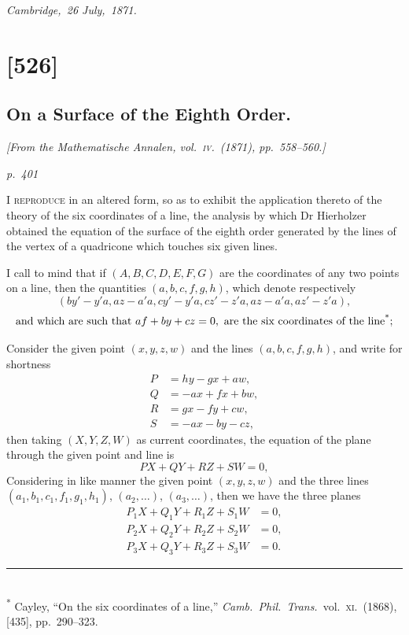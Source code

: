 \documentclass[11pt,a4paper]{book}
\begin{document}
\noindent\textit{Cambridge,\ 26 July,\ 1871.}

\clearpage

\section{[526]}
\subsection{On a Surface of the Eighth Order.}

\begin{center}
\textit{[From the Mathematische Annalen, vol.~\textsc{iv}.\ (1871), pp.~558--560.]}
\end{center}

\textit{p.~401}

\noindent
\textsc{I reproduce} in an altered form, so as to exhibit the application thereto of the
theory of the six coordinates of a line, the analysis by which Dr Hierholzer obtained
the equation of the surface of the eighth order generated by the lines of the vertex of a
quadricone which touches six given lines.

I call to mind that if $(A, B, C, D, E, F, G)$ are the coordinates of any two
points on a line, then the quantities $(a, b, c, f, g, h)$, which denote respectively
\[
(by' - y'a, az - a'a, cy' - y'a, cz' - z'a, az - a'a, az' - z'a),
\]
\[
\text{and which are such that } af + by + cz = 0, \text{ are the six coordinates of the line\textsuperscript{*};}
\]

Consider the given point $(x, y, z, w)$ and the lines $(a, b, c, f, g, h)$, and write
for shortness
\[
\begin{aligned}
P &= hy - g x + a w, \\
Q &= -ax + f x + b w, \\
R &= g x - f y + c w, \\
S &= -ax - b y - c z,
\end{aligned}
\]
then taking $(X, Y, Z, W)$ as current coordinates, the equation of the plane through
the given point and line is
\[
P X + Q Y + R Z + S W = 0,
\]
\noindent\hfill
Considering in like manner the given point $(x, y, z, w)$ and the three lines
$(a_1, b_1, c_1, f_1, g_1, h_1)$, $(a_2, \ldots)$, $(a_3, \ldots)$, then we have the three planes
\begin{align*}
P_1 X + Q_1 Y + R_1 Z + S_1 W &= 0, \\
P_2 X + Q_2 Y + R_2 Z + S_2 W &= 0, \\
P_3 X + Q_3 Y + R_3 Z + S_3 W &= 0.
\end{align*}
\noindent\rule{0.45\textwidth}{0.4pt}\\
\footnotesize\textsuperscript{*} Cayley, ``On the six coordinates of a line,'' \textit{Camb.\ Phil.\ Trans.}\ vol.\ \textsc{xi}.\ (1868), [435], pp.\ 290--323.\normalsize
\end{document}
